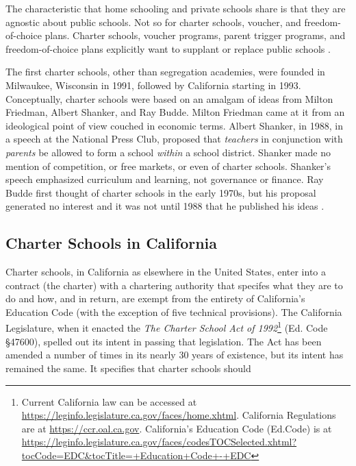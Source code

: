 The characteristic that home schooling and private schools share is that they are agnostic about public schools. Not so for charter schools, voucher, and freedom-of-choice plans. Charter schools, voucher programs, parent trigger programs, and freedom-of-choice plans explicitly want to supplant or replace public schools \parencite{Garcia2018}.

The first charter schools, other than segregation academies, were founded in Milwaukee, Wisconsin in 1991, followed by California starting in 1993. Conceptually, charter schools were based on an amalgam of ideas from Milton Friedman, Albert Shanker, and Ray Budde. Milton Friedman came at it from an ideological point of view couched in economic terms. Albert Shanker, in 1988, in a speech at the National Press Club, proposed that \textit{teachers} in conjunction with \textit{parents} be allowed to form a school \textit{within} a school district. Shanker made no mention of competition, or free markets, or even of charter schools. Shanker's speech emphasized curriculum and learning, not governance or finance. Ray Budde first thought of charter schools in the early 1970s, but his proposal generated no interest and it was not until 1988 that he published his ideas \parencite{Budde1988}.

\subsection{Charter Schools in California}\label{sec:charters-in-ca}\indent

Charter schools, in California as elsewhere in the United States, enter into a contract (the charter) with a chartering authority that specifes what they are to do and how, and in return, are exempt from the entirety of California's Education Code (with the exception of five technical provisions). The California Legislature, when it enacted the \textit{The Charter School Act of 1992}\footnote{Current California law can be accessed at \url{https://leginfo.legislature.ca.gov/faces/home.xhtml}. California Regulations are at \url{https://ccr.oal.ca.gov}. California's Education Code (Ed.Code) is at \url{https://leginfo.legislature.ca.gov/faces/codesTOCSelected.xhtml?tocCode=EDC&tocTitle=+Education+Code+-+EDC}} (Ed. Code §47600), spelled out its intent in passing that legislation. The Act has been amended a number of times in its nearly 30 years of existence, but its intent has remained the same. It specifies that charter schools should


